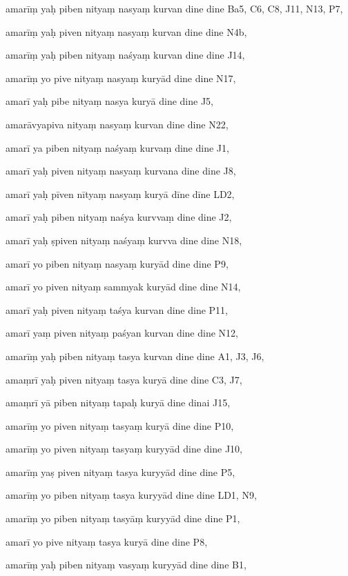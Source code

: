 \begin{marma}[hp03_096]


\item[amarīṃ yaḥ piben nityaṃ nasyaṃ kurvan dine dine] Ba5, C6, C8, J11, N13, P7,
\item[amarīṃ yaḥ piven nityaṃ nasyaṃ kurvan dine dine] N4b,
\item[amarīṃ yaḥ piben nityaṃ naśyaṃ kurvan dine dine] J14,
\item[amarīṃ yo pive nityaṃ nasyaṃ kuryād dine dine] N17,
\item[amarī yaḥ pibe nityaṃ nasya kuryā dine dine] J5,
\item[amarāvyapiva nityaṃ nasyaṃ kurvan dine dine] N22,
\item[amarī ya piben nityaṃ naśyaṃ kurvaṃ dine dine] J1,
\item[amarī yaḥ piven nityaṃ nasyaṃ kurvana dine dine] J8,
\item[amarī yaḥ pīven nītyaṃ nasyaṃ kuryā dīne dīne] LD2,
\item[amarī yaḥ piben nityaṃ naśya kurvvaṃ dine dine] J2,
\item[amarī yaḥ ṣpiven nityaṃ naśyaṃ kurvva dine dine] N18,
\item[amarī yo piben nityaṃ nasyaṃ kuryād dine dine] P9,
\item[amarī yo piven nityaṃ sammyak kuryād dine dine] N14,
\item[amarī yaḥ piven nityaṃ taśya kurvan dine dine] P11,
\item[amarī yaṃ piven nityaṃ paśyan kurvan dine dine] N12,
\item[amarīṃ yaḥ piben nityaṃ tasya kurvan dine dine] A1, J3, J6, 
\item[amaṃrī yaḥ piven nityaṃ tasya kuryā dine dine] C3, J7,
\item[amaṃrī yā piben nityaṃ tapaḥ kuryā dine dinai] J15,
\item[amarīṃ yo piven nityaṃ tasyaṃ kuryā dine dine] P10,
\item[amarīṃ yo piven nityaṃ tasyaṃ kuryyād dine dine] J10,
\item[amarīṃ yaṣ piven nityaṃ tasya kuryyād dine dine] P5,
\item[amarīṃ yo piben nityaṃ tasya kuryyād dine dine] LD1, N9,
\item[amarīṃ yo piben nityaṃ tasyāṃ kuryyād dine dine] P1,
\item[amarī yo pive nityaṃ tasya kuryā dine dine] P8,
\item[amarīṃ yaḥ piben nityaṃ vasyaṃ kuryyād dine dine] B1, 

\end{marma}
